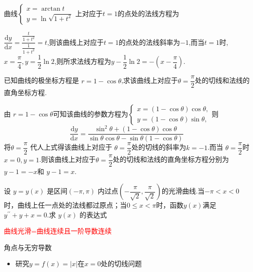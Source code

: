 \documentclass[8pt a4paper, oneside, UTF8]{ctexbook}  %
\begin{document}
\begin{sloppypar}
    \begin{problem}
        曲线$\begin{cases}
            x=\arctan t \\
            y=\ln\sqrt{1+t^2}
        \end{cases}$上对应于$t=1$的点处的法线方程为
    \end{problem}
    \begin{solution}
        $\dfrac{\mathrm{d}y}{\mathrm{d}x}=\dfrac{\frac{t}{1+t^{2}}}{\frac{1}{1+t^{2}}}=t$,则该曲线上对应于$t=1$的点处的法线斜率为$-1$,而当$t=1$时,$x=\dfrac{\pi}{4},y=\dfrac{1}{2}\ln2$,则所求法线方程为$y - \dfrac{1}{2}\ln 2 =-(x-\dfrac{\pi}{4}).$
    \end{solution}
    \begin{problem}
        已知曲线的极坐标方程是 $r=1-\cos\theta$,求该曲线上对应于$\theta=\dfrac\pi2$处的切线和法线的直角坐标方程.
    \end{problem}
    \begin{solution}
        由 $r=1-\cos\theta$可知该曲线的参数方程为$\begin{cases}x=(1-\cos\theta)\cos\theta,\\y=(1-\cos\theta)\sin\theta,\end{cases}$则
        $$
            \dfrac{\mathrm{d}y}{\mathrm{d}x}=\dfrac{\sin^2\theta+(1-\cos\theta)\cos\theta}{\sin\theta\cos\theta-\sin\theta(1-\cos\theta)}
        $$
        将$\theta=\dfrac\pi2$ 代人上式得该曲线上对应于 $\theta=\dfrac\pi2$处的切线的斜率为$k=-1$.而当 $\theta=\dfrac\pi2$时$x=0,y=1$.则该曲线上对应于$\theta=\dfrac\pi2$处的切线和法线的直角坐标方程分别为$y-1=-x$和 $y-1=x$.
    \end{solution}
    \begin{problem}
        设 $y=y(x)$ 是区间$(-\pi,\pi)$ 内过点$\left(-\dfrac\pi{\sqrt{2}},\dfrac\pi{\sqrt{2}}\right)$的光滑曲线.当$-\pi<x<0$ 时，曲线上任一点处的法线都过原点；当$0\leqslant x<\pi$时，函数$y(x)$满足$y^{\prime\prime}+y+x=0.$求 $y(x)$ 的表达式        
    \end{problem}
    \begin{solution}
    \end{solution}
    \begin{note}
        \textcolor{red}{曲线光滑=曲线连续且一阶导数连续}
    \end{note}
    \begin{criterion}{角点与无穷导数}{}
        \begin{itemize}
            \item 研究$y=f(x)=|x|$在$x=0$处的切线问题

\end{itemize}
\end{criterion}
\end{sloppypar}
\end{document}
